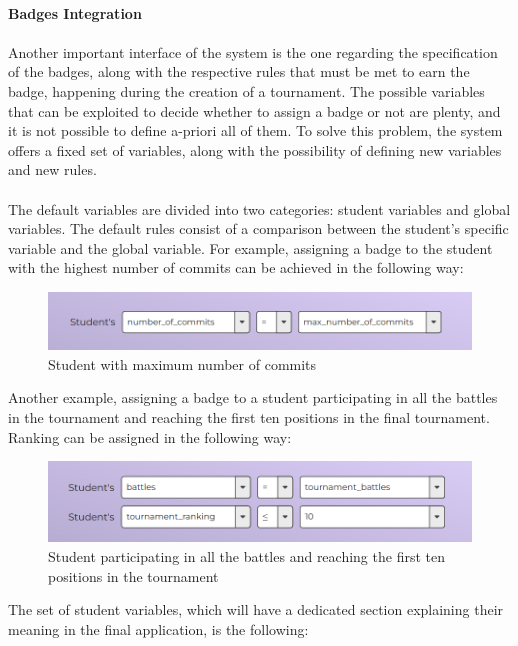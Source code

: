 \clearpage
\textbf{ }\\
\textbf{Badges Integration}\\
\\
Another important interface of the system is the one regarding the specification of the badges, along with the respective rules that must be met to earn the badge, happening during the creation of a tournament. The possible variables that can be exploited to decide whether to assign a badge or not are plenty, and it is not possible to define a-priori all of them. To solve this problem, the system offers a fixed set of variables, along with the possibility of defining new variables and new rules.\\
\\
The default variables are divided into two categories: student variables and global variables. The default rules consist of a comparison between the student's specific variable and the global variable. For example, assigning a badge to the student with the highest number of commits can be achieved in the following way:
\begin{figure}[H]
    \centering
    \includegraphics[width=0.9\linewidth]{Images/UI_Badge_form1.png}
    \caption{Student with maximum number of commits}
    \label{fig:UI_form1}
\end{figure}
Another example, assigning a badge to a student participating in all the battles in the tournament and reaching the first ten positions in the final tournament. Ranking can be assigned in the following way:
\begin{figure}[H]
    \centering
    \includegraphics[width=0.9\linewidth]{Images/UI_Badge_form2.png}
    \caption{Student participating in all the battles and reaching the first ten positions in the tournament}
    \label{fig:UI_form2}
\end{figure}
The set of student variables, which will have a dedicated section explaining their meaning in the final application, is the following:

